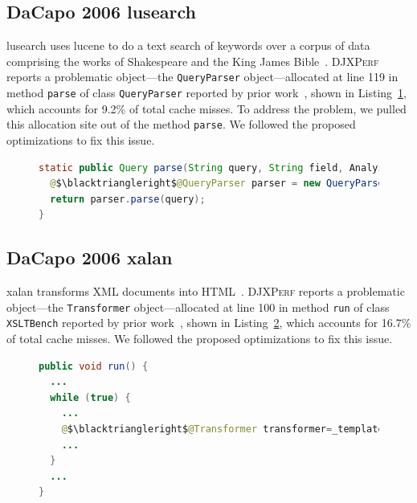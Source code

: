 \documentclass[sigconf,10pt,review,anonymous]{acmart}\settopmatter{printfolios=true,printccs=false,printacmref=false}
\newcommand{\tool}[0]{\mbox{\textsc{DJXPerf}}}
\begin{document}
\subsection{DaCapo 2006 lusearch}
lusearch uses lucene to do a text search of keywords over a corpus of data comprising the works of Shakespeare and the King James Bible~\cite{dacapo}. \tool{} reports a problematic object---the {\tt QueryParser} object---allocated at line 119 in method {\tt parse} of class {\tt QueryParser} reported by prior work~\cite{Reusable}, shown in Listing~\ref{lusearch}, which accounts for 9.2\% of total cache misses. To address the problem, we pulled this allocation site out of the method {\tt parse}. We followed the proposed optimizations to fix this issue.

\begin{figure}
\begin{lstlisting}[firstnumber=118,language=java]
static public Query parse(String query, String field, Analyzer analyzer) {
  @$\blacktriangleright$@QueryParser parser = new QueryParser(field,analyzer);
  return parser.parse(query);
}
\end{lstlisting}
\vspace{-0.3in}
\label{lusearch}
\end{figure}

\subsection{DaCapo 2006 xalan}
xalan transforms XML documents into HTML~\cite{dacapo}. \tool{} reports a problematic object---the {\tt Transformer} object---allocated at line 100 in method {\tt run} of class {\tt XSLTBench} reported by prior work~\cite{Reusable}, shown in Listing~\ref{xalan}, which accounts for 16.7\% of total cache misses. We followed the proposed optimizations to fix this issue.

\begin{figure}
\begin{lstlisting}[firstnumber=96,language=java]
public void run() {
  ...
  while (true) {
    ...
    @$\blacktriangleright$@Transformer transformer=_template.newTransformer();
    ...
  }
  ...
}
\end{lstlisting}
\vspace{-0.3in}
\label{xalan}
\end{figure}
\end{document}
